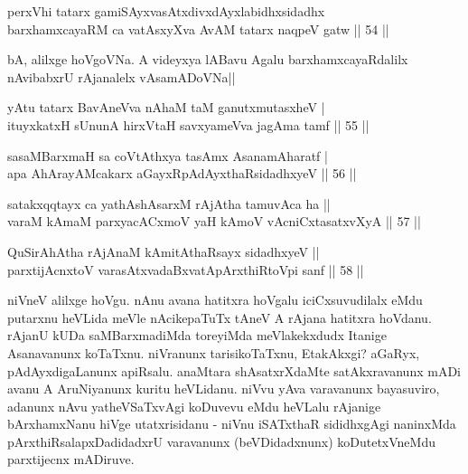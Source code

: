 \begin{shl}
perxVhi tatarx gamiSAyxvasAtxdivxdAyxlabidhxsidadhx\\
barxhamxcayaRM ca vatAsxyXva AvAM tatarx naqpeV gatw \hfill|| 54 || 
\end{shl}

\begin{artha}
bA, alilxge hoVgoVNa. A videyxya lABavu Agalu barxhamxcayaRdalilx 
nAvibabxrU rAjanalelx vAsamADoVNa||
\end{artha}


\begin{shl}
yAtu tatarx BavAneVva nAhaM taM ganutxmutasxheV | \\
ituyxkatxH sUnunA hirxVtaH savxyameVva jagAma tamf \hfill|| 55 || 
\end{shl}

\begin{shl}
sasaMBarxmaH sa coVtAthxya tasAmx AsanamAharatf | \\
apa AhArayAMcakarx aGayxRpAdAyxthaRsidadhxyeV \hfill|| 56 || 
\end{shl}

\begin{shl}
satakxqqtayx ca yathAshAsarxM rAjA\s tha tamuvAca ha || \\
varaM kAmaM parxyacACxmoV yaH kAmoV vAcniCxtasatxvXyA \hfill|| 57 || 
\end{shl}

\begin{shl}
QuSirAhAtha rAjAnaM kAmitAthaRsayx sidadhxyeV || \\
parxtijAcnxtoV varasAtxvadaBxvatA\s pArxthiRtoV\s pi sanf \hfill|| 58 || 
\end{shl}

\begin{artha}
niVneV alilxge hoVgu. nAnu avana hatitxra hoVgalu iciCxsuvudilalx eMdu 
putarxnu heVLida meVle nAcikepaTuTx tAneV A rAjana hatitxra hoVdanu. 
rAjanU kUDa saMBarxmadiMda toreyiMda meVlakekxdudx Itanige Asanavanunx 
koTaTxnu. niVranunx tarisikoTaTxnu, EtakAkxgi? aGaRyx, 
pAdAyxdigaLanunx apiRsalu. anaMtara shAsatxrXdaMte satAkxravanunx mADi 
avanu A AruNiyanunx kuritu heVLidanu. niVvu yAva varavanunx 
bayasuviro, adanunx nAvu yatheVSaTxvAgi koDuvevu eMdu heVLalu rAjanige 
bArxhamxNanu hiVge utatxrisidanu - niVnu iSATxthaR sididhxgAgi 
naninxMda pArxthiRsalapxDadidadxrU varavanunx (beVDidadxnunx) 
koDutetxVneMdu parxtijecnx mADiruve.
\end{artha}

